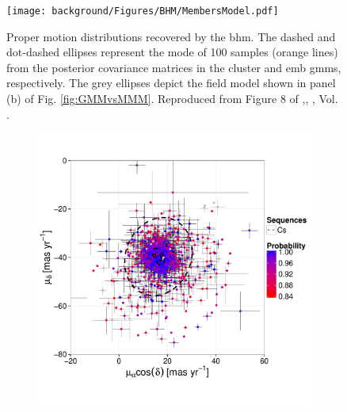 \begin{figure}[ht!]
\begin{center}
\texttt{[image: background/Figures/BHM/MembersModel.pdf]}
\caption{Proper motion distributions recovered by the \gls{bhm}. The dashed and dot-dashed ellipses represent the mode of 100 samples (orange lines) from the posterior covariance matrices in the cluster and \gls{emb} \glspl{gmm}, respectively. The grey ellipses depict the field model shown in panel (b) of Fig. \ref{fig:GMMvsMMM}. Reproduced from Figure 8 of \citet{Olivares2017},\textit{}, , Vol. .}
\label{fig:PM}
\end{center}
\end{figure}

\begin{figure}[ht!]
    \centering
    \begin{subfigure}[t]{0.45\textwidth}
    \centering
       \includegraphics[page=2,width=\textwidth]{background/Figures/BHM/Cs_members.pdf}
        \caption{}
    \end{subfigure}
    \begin{subfigure}[t]{0.45\textwidth}
    \centering

\end{subfigure}
\end{figure}
